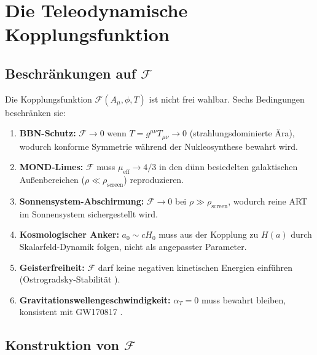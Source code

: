 \documentclass[aps,prd,twocolumn,superscriptaddress,nofootinbib]{revtex4-2}
\begin{document}
\section{Die Teleodynamische Kopplungsfunktion}
\label{sec:coupling}

\subsection{Beschr\"ankungen auf $\mathcal{F}$}
\label{sec:constraints}

Die Kopplungsfunktion $\mathcal{F}(A_\mu, \phi, T)$ ist nicht frei wahlbar. Sechs Bedingungen beschr\"anken sie:

\begin{enumerate}
\item \textbf{BBN-Schutz:} $\mathcal{F} \to 0$ wenn $T = g^{\mu\nu}T_{\mu\nu} \to 0$ (strahlungsdominierte \"Ara), wodurch konforme Symmetrie w\"ahrend der Nukleosynthese bewahrt wird.

\item \textbf{MOND-Limes:} $\mathcal{F}$ muss $\mu_{\mathrm{eff}} \to 4/3$ in den d\"unn besiedelten galaktischen Au\ss{}enbereichen ($\rho \ll \rho_{\mathrm{screen}}$) reproduzieren.

\item \textbf{Sonnensystem-Abschirmung:} $\mathcal{F} \to 0$ bei $\rho \gg \rho_{\mathrm{screen}}$, wodurch reine ART im Sonnensystem sichergestellt wird.

\item \textbf{Kosmologischer Anker:} $a_0 \sim cH_0$ muss aus der Kopplung zu $H(a)$ durch Skalarfeld-Dynamik folgen, nicht als angepasster Parameter.

\item \textbf{Geisterfreiheit:} $\mathcal{F}$ darf keine negativen kinetischen Energien einf\"uhren (Ostrogradsky-Stabilit\"at \cite{Woodard2015}).

\item \textbf{Gravitationswellengeschwindigkeit:} $\alpha_T = 0$ muss bewahrt bleiben, konsistent mit GW170817 \cite{Abbott2017}.
\end{enumerate}

\subsection{Konstruktion von $\mathcal{F}$}
\label{sec:construction}
\end{document}
